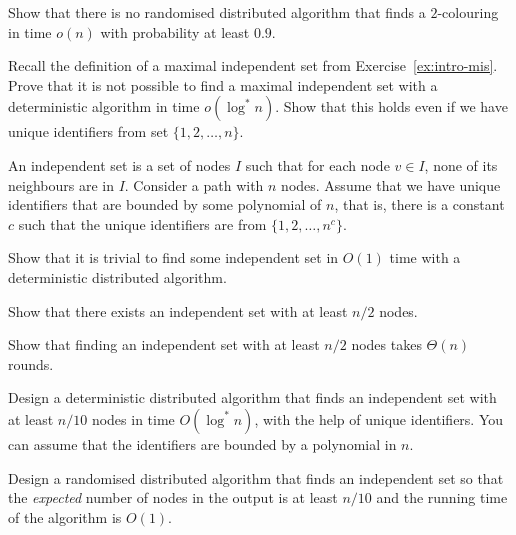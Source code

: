 \begin{ex}
    Show that there is no randomised distributed algorithm that finds a $2$-colouring in time $o(n)$ with probability at least $0.9$.
\end{ex}

\begin{ex}
    Recall the definition of a maximal independent set from Exercise~\ref{ex:intro-mis}. Prove that it is not possible to find a maximal independent set with a deterministic algorithm in time $o(\log^* n)$. Show that this holds even if we have unique identifiers from set $\{1,2,\dotsc,n\}$.
\end{ex}

\begin{ex}
    An independent set is a set of nodes $I$ such that for each node $v \in I$, none of its neighbours are in $I$. Consider a path with $n$ nodes. Assume that we have unique identifiers that are bounded by some polynomial of $n$, that is, there is a constant $c$ such that the unique identifiers are from $\{1,2,\dotsc,n^c\}$.
    \begin{subex}
        \item Show that it is trivial to find some independent set in $O(1)$ time with a deterministic distributed algorithm.
        \item Show that there exists an independent set with at least $n/2$ nodes.
        \item Show that finding an independent set with at least $n/2$ nodes takes $\Theta(n)$ rounds.
        \item Design a deterministic distributed algorithm that finds an independent set with at least $n/10$ nodes in time $O(\log^* n)$, with the help of unique identifiers. You can assume that the identifiers are bounded by a polynomial in $n$.
        \item Design a randomised distributed algorithm that finds an independent set so that the \emph{expected} number of nodes in the output is at least $n/10$ and the running time of the algorithm is $O(1)$.
    \end{subex}
\end{ex}

